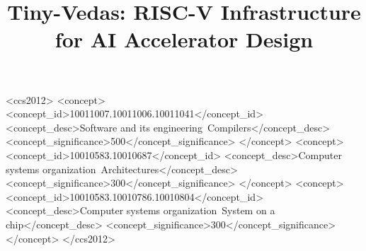 \documentclass[sigplan,nonacm,authorversion,screen]{acmart}
\title{Tiny-Vedas: {RISC-V} Infrastructure for {AI} Accelerator Design}
\begin{document}
\begin{abstract}

\end{abstract}

\begin{CCSXML}
<ccs2012>
 <concept>
  <concept_id>10011007.10011006.10011041</concept_id>
  <concept_desc>Software and its engineering~Compilers</concept_desc>
  <concept_significance>500</concept_significance>
 </concept>
 <concept>
  <concept_id>10010583.10010687</concept_id>
  <concept_desc>Computer systems organization~Architectures</concept_desc>
  <concept_significance>300</concept_significance>
 </concept>
 <concept>
  <concept_id>10010583.10010786.10010804</concept_id>
  <concept_desc>Computer systems organization~System on a chip</concept_desc>
  <concept_significance>300</concept_significance>
 </concept>
</ccs2012>
\end{CCSXML}


\maketitle






\appendix

\end{document}
